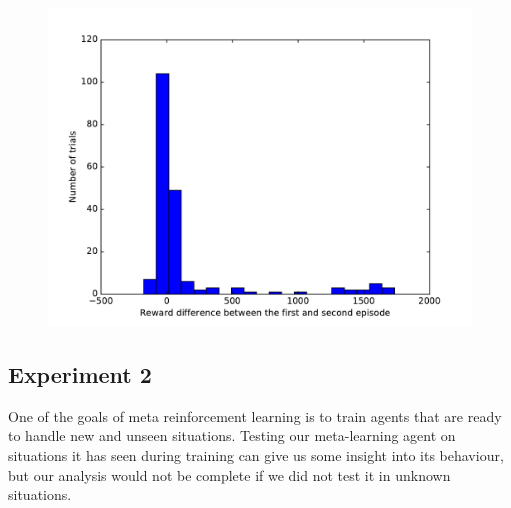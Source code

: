 \documentclass[letterpaper]{article}
\begin{document}
\begin{figure}
	\centering
	\caption{}
	\label{fig:distrib}
\end{figure}
\begin{figure}[h]
	\centering
	\includegraphics[width=\linewidth]{fig/reward_diff.pdf}
	\caption{}
	\label{fig:reward_diff}
\end{figure}

\subsection{Experiment 2}
One of the goals of meta reinforcement learning is to train agents that are
ready to handle new and unseen situations. Testing our meta-learning agent
on situations it has seen during training can give us some insight into
its behaviour, but our analysis would not be complete if we did not test it 
in unknown situations.
\end{document}
